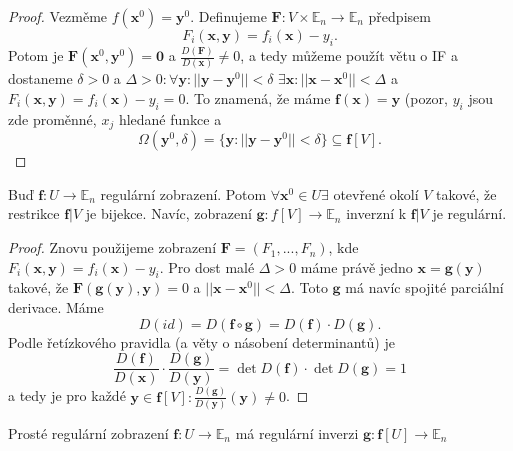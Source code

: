 \documentclass[../main.tex]{subfiles}
\begin{document}
\begin{proof}
	Vezměme $f(\textbf{x}^0) = \textbf{y}^0.$ Definujeme $\textbf{F} : V \times \mathbb{E}_n \rightarrow \mathbb{E}_n$ předpisem
	\[F_i(\textbf{x},\textbf{y}) = f_i(\textbf{x}) - y_i.\]
	Potom je $\textbf{F}(\textbf{x}^0,\textbf{y}^0) = \textbf{0}$
	a $\frac{D(\textbf{F})}{D(\textbf{x})} \neq 0$, 
	a tedy můžeme použít větu o IF a dostaneme 
	$\delta > 0$ a $\Delta > 0 : \forall \textbf{y} : ||\textbf{y} - \textbf{y}^0|| < \delta$ $\exists \textbf{x} : ||\textbf{x} - \textbf{x}^0|| < \Delta$ a 
	$F_i(\textbf{x},\textbf{y}) = f_i(\textbf{x}) - y_i = 0$. To znamená, že máme $\textbf{f}(\textbf{x}) = \textbf{y}$ (pozor, $y_i$ jsou zde proměnné, $x_j$ hledané funkce a
	\[\Omega(\textbf{y}^0,\delta) = \{\textbf{y} : ||\textbf{y} - \textbf{y}^0 || < \delta \} \subseteq \textbf{f}[V].\]
\end{proof}

\begin{lemma}
	Buď $\mathbf{f}: U \to \mathbb{E}_n$ regulární zobrazení. Potom $\forall \mathbf{x}^0 \in U \exists$
	otevřené okolí $V$ takové, že restrikce $\mathbf{f}|V$ je bijekce. Navíc, zobrazení
	$\mathbf{g}: f[V] \to \mathbb{E}_n$ inverzní k $\mathbf{f}|V$ je regulární.
\end{lemma}

\begin{proof}
	Znovu použijeme zobrazení $\textbf{F} = (F_1,...,F_n)$, kde $F_i(\textbf{x},\textbf{y}) = f_i(\textbf{x})-y_i$. Pro dost malé 
	$\Delta > 0$ máme právě jedno $\textbf{x} = \textbf{g}(\textbf{y})$ takové, že $\textbf{F}(\mathbf{g}(\textbf{y}),\textbf{y}) = 0$ a $||\textbf{x} - \textbf{x}^0|| < \Delta$.
	Toto $\textbf{g}$ má navíc spojité parciální derivace. Máme
	\[D(id) = D(\textbf{f}\circ\textbf{g}) = D(\textbf{f})\cdot D(\textbf{g}).\]
	Podle řetízkového pravidla (a věty o násobení determinantů) je 
	\[\frac{D(\textbf{f})}{D(\textbf{x})}\cdot\frac{D(\textbf{g})}{D(\textbf{y})} = \det D(\textbf{f})\cdot \det D(\textbf{g}) = 1\]
	a tedy je pro každé $\textbf{y} \in \textbf{f}[V] \colon \frac{D(\textbf{g})}{D(\textbf{y})}(\textbf{y}) \neq 0$.
\end{proof}

\begin{consequence}
	Prosté regulární zobrazení $\mathbf{f}: U \to \mathbb{E}_n$ má regulární inverzi
	$\mathbf{g}: \mathbf{f}[U] \to \mathbb{E}_n$
\end{consequence}
\end{document}
